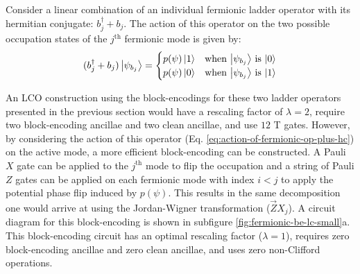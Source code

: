 Consider a linear combination of an individual fermionic ladder operator with its hermitian conjugate: $b_j^\dagger + b_j$.
The action of this operator on the two possible occupation states of the $j^\text{th}$ fermionic mode is given by:
\begin{equation}
    \label{eq:action-of-fermionic-op-plus-hc}
    \begin{split}
        (b_j^\dagger + b_j) \ket{\psi_{b_j}} = \begin{cases} 
            p(\psi) \ket{1} & \text{when $\ket{\psi_{b_j}}$ is $\ket{0}$} \\
            p(\psi) \ket{0} & \text{when $\ket{\psi_{b_j}}$ is $\ket{1}$} \\
                                        \end{cases}
    \end{split}
\end{equation}

An LCO construction using the block-encodings for these two ladder operators presented in the previous section would have a rescaling factor of $\lambda = 2$, require two block-encoding ancillae and two clean ancillae, and use $12$ T gates.
However, by considering the action of this operator (Eq. \ref{eq:action-of-fermionic-op-plus-hc}) on the active mode, a more efficient block-encoding can be constructed.
A Pauli $X$ gate can be applied to the $j^\text{th}$ mode to flip the occupation and a string of Pauli $Z$ gates can be applied on each fermionic mode with index $i < j$ to apply the potential phase flip induced by $p(\psi)$.
This results in the same decomposition one would arrive at using the Jordan-Wigner transformation ($\vec{Z}X_j$).
A circuit diagram for this block-encoding is shown in subfigure \ref{fig:fermionic-be-lc-small}a.
This block-encoding circuit has an optimal rescaling factor ($\lambda = 1$), requires zero block-encoding ancillae and zero clean ancillae, and uses zero non-Clifford operations.

